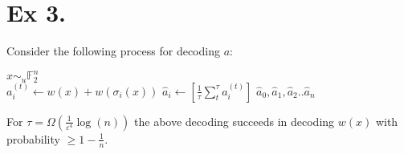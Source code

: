 \documentclass{article}
\newcommand{\FF}{\mathbb{F}}
\begin{document}
\section{Ex 3.}
Consider the following process for decoding $a$:

\begin{algorithm}[H]
    {
     {
      $x \sim_{u} \FF_{2}^{n}$ \\
      $a_{i}^{(t)} \leftarrow w\left( x \right) + w\left( \sigma_{i}(x) \right)$
    }
}
 {
  $\hat{a}_{i} \leftarrow [ \frac{1}{\tau}\sum_{t}^{\tau}{ a_{i}^{(t)}  }  ]$ 
}
\Return $ \hat{a}_{0}, \hat{a}_{1}, \hat{a}_{2} .. \hat{a}_{n} $
\end{algorithm}

\begin{claim}
  For $\tau = \Omega\left( \frac{1}{\varepsilon^{4}} \log\left( n \right) \right)$ the above decoding succeeds in decoding $w\left( x \right)$ with probability $\ge 1 - \frac{1}{n}$.
\end{claim}
\end{document}
